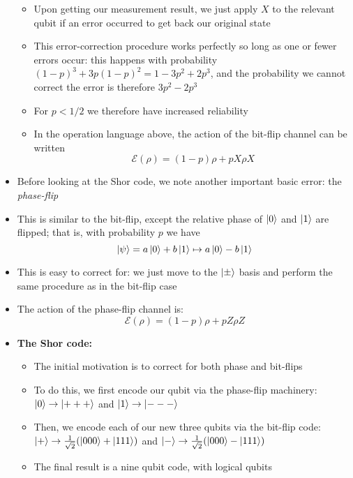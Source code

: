 \documentclass[12pt,a4paper]{article}
\numberwithin{equation}{section}
\begin{document}
\begin{itemize}
\begin{itemize}
			\item Upon getting our measurement result, we just apply $X$ to the relevant qubit if an error occurred to get back our original state
			\item This error-correction procedure works perfectly so long as one or fewer errors occur: this happens with probability $(1-p)^{3}+3p(1-p)^{2}=1-3p^{2}+2p^{3}$, and the probability we cannot correct the error is therefore $3p^{2}-2p^{3}$
			\item For $p<1/2$ we therefore have increased reliability
			\item In the operation language above, the action of the bit-flip channel can be written
			\begin{equation}
				\mathcal{E}(\rho)=(1-p)\rho+pX\rho X
			\end{equation}
		\end{itemize}
		\item Before looking at the Shor code, we note another important basic error: the \textit{phase-flip} 
		\item This is similar to the bit-flip, except the relative phase of $\ket{0}$ and $\ket{1}$ are flipped; that is, with probability $p$ we have
		\begin{equation}
			\ket{\psi}=a\ket{0}+b\ket{1}\mapsto a\ket{0}-b\ket{1}
		\end{equation}
		\item This is easy to correct for: we just move to the $\ket{\pm}$ basis and perform the same procedure as in the bit-flip case
		\item The action of the phase-flip channel is:
		\begin{equation}
			\mathcal{E}(\rho)=(1-p)\rho+pZ\rho Z
		\end{equation}
		\item \textbf{The Shor code:}
		\begin{itemize}
			\item The initial motivation is to correct for both phase and bit-flips
			\item To do this, we first encode our qubit via the phase-flip machinery: $\ket{0}\to\ket{+++}$ and $\ket{1}\to \ket{---}$
			\item Then, we encode each of our new three qubits via the bit-flip code: $\ket{+}\to\frac{1}{\sqrt{2}}(\ket{000}+\ket{111})$ and $\ket{-}\to\frac{1}{\sqrt{2}}(\ket{000}-\ket{111})$
			\item The final result is a nine qubit code, with logical qubits
			\begin{equation}

\end{equation}
\end{itemize}
\end{itemize}
\end{document}
